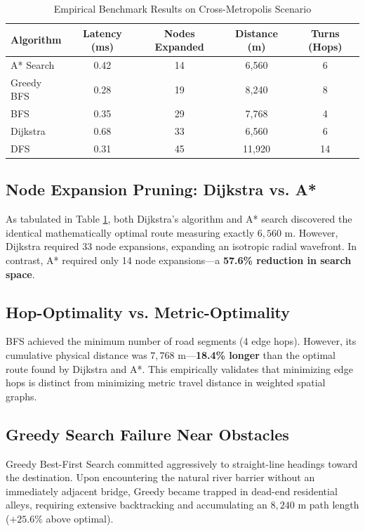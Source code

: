 \documentclass[conference]{IEEEtran}
\begin{document}
\begin{table}[htbp]
\caption{Empirical Benchmark Results on Cross-Metropolis Scenario}
\begin{center}
\begin{tabular}{lcccc}
\toprule
\textbf{Algorithm} & \textbf{Latency (ms)} & \textbf{Nodes Expanded} & \textbf{Distance (m)} & \textbf{Turns (Hops)} \\
\midrule
A* Search & 0.42 & 14 & 6,560 & 6 \\
Greedy BFS & 0.28 & 19 & 8,240 & 8 \\
BFS & 0.35 & 29 & 7,768 & 4 \\
Dijkstra & 0.68 & 33 & 6,560 & 6 \\
DFS & 0.31 & 45 & 11,920 & 14 \\
\bottomrule
\end{tabular}
\label{tab:results}
\end{center}
\end{table}

\subsection{Node Expansion Pruning: Dijkstra vs. A*}
As tabulated in Table \ref{tab:results}, both Dijkstra's algorithm and A* search discovered the identical mathematically optimal route measuring exactly $6{,}560\text{ m}$. However, Dijkstra required 33 node expansions, expanding an isotropic radial wavefront. In contrast, A* required only 14 node expansions—a \textbf{57.6\% reduction in search space}.

\subsection{Hop-Optimality vs. Metric-Optimality}
BFS achieved the minimum number of road segments (4 edge hops). However, its cumulative physical distance was $7{,}768\text{ m}$—\textbf{18.4\% longer} than the optimal route found by Dijkstra and A*. This empirically validates that minimizing edge hops is distinct from minimizing metric travel distance in weighted spatial graphs.

\subsection{Greedy Search Failure Near Obstacles}
Greedy Best-First Search committed aggressively to straight-line headings toward the destination. Upon encountering the natural river barrier without an immediately adjacent bridge, Greedy became trapped in dead-end residential alleys, requiring extensive backtracking and accumulating an $8{,}240\text{ m}$ path length ($+25.6\%$ above optimal).
\end{document}
